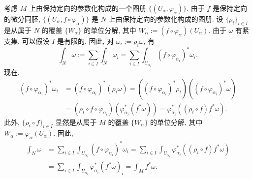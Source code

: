 \begin{description}[font=\normalfont,leftmargin=2em,labelwidth=1.5em]
考虑 $M$ 上由保持定向的参数化构成的一个图册 $\{(U_\alpha,\varphi_\alpha)\}$. 由于 $f$ 是保持定向的微分同胚, $\{(U_\alpha,f\circ\varphi_\alpha)\}$ 是 $N$ 上由保持定向的参数化构成的图册. 设 $\{\rho_i\}_{i\in I}$ 是从属于 $N$ 的覆盖 $\{W_\alpha\}$ 的单位分解, 其中 $W_\alpha:=(f\circ\varphi_\alpha)(U_\alpha)$. 由于 $\omega$ 有紧支集, 可以假设 $I$ 是有限的. 因此, 对 $\omega_i:=\rho_i\omega$, 有
\[
  \int_N\omega:=\sum_{i\in I}\int_N\omega_i
    =\sum_{i\in I}\int_{U_{\alpha_i}}(f\circ\varphi_{\alpha_i})^*\omega_i.
\]
现在,
\begin{align*}
  (f\circ\varphi_{\alpha_i})^*\omega_i
  &=(f\circ\varphi_{\alpha_i})^*(\rho_i\omega)
   =((f\circ\varphi_{\alpha_i})^*\rho_i)((f\circ\varphi_{\alpha_i})^*\omega)\\
  &=(\rho_i\circ f\circ\varphi_{\alpha_i})(\varphi_{\alpha_i}^*(f^*\omega))
   =\varphi_{\alpha_i}^*((\rho_i\circ f)f^*\omega).
\end{align*}
此外, $\{\rho_i\circ f\}_{i\in I}$ 显然是从属于 $M$ 的覆盖 $\{W_\alpha\}$ 的单位分解, 其中 $W_\alpha:=\varphi_\alpha(U_\alpha)$. 因此,
\begin{align*}
  \int_N\omega
  &=\sum_{i\in I}\int_{U_{\alpha_i}}(f\circ\varphi_{\alpha_i})^*\omega_i
   =\sum_{i\in I}\int_{U_{\alpha_i}}\varphi_{\alpha_i}^*((\rho_i\circ f)f^*\omega)\\
  &=\sum_{i\in I}\int_{U_{\alpha_i}}\varphi_{\alpha_i}^*(f^*\omega)_i
   =\int_M f^*\omega.
\end{align*}
\end{description}

